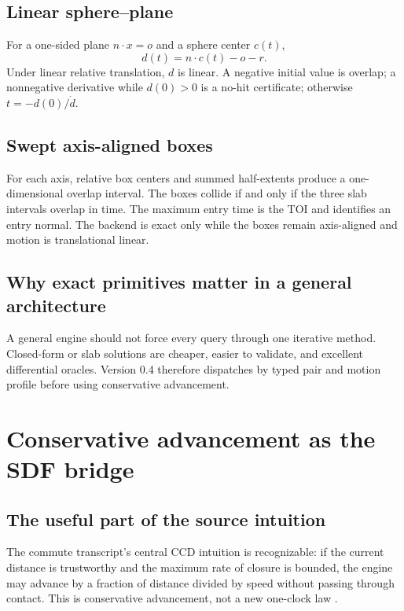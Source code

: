 \documentclass[11pt,a4paper,openany]{book}
\begin{document}
\section{Linear sphere--plane}
For a one-sided plane $n\cdot x=o$ and a sphere center $c(t)$,
\begin{equation}
  d(t)=n\cdot c(t)-o-r.
\end{equation}
Under linear relative translation, $d$ is linear. A negative initial value is overlap; a nonnegative derivative while $d(0)>0$ is a no-hit certificate; otherwise $t=-d(0)/\dot d$.

\section{Swept axis-aligned boxes}
For each axis, relative box centers and summed half-extents produce a one-dimensional overlap interval. The boxes collide if and only if the three slab intervals overlap in time. The maximum entry time is the TOI and identifies an entry normal. The backend is exact only while the boxes remain axis-aligned and motion is translational linear.

\section{Why exact primitives matter in a general architecture}
A general engine should not force every query through one iterative method. Closed-form or slab solutions are cheaper, easier to validate, and excellent differential oracles. Version 0.4 therefore dispatches by typed pair and motion profile before using conservative advancement.

\chapter{Conservative advancement as the SDF bridge}
\section{The useful part of the source intuition}
The commute transcript's central CCD intuition is recognizable: if the current distance is trustworthy and the maximum rate of closure is bounded, the engine may advance by a fraction of distance divided by speed without passing through contact. This is conservative advancement, not a new one-clock law \citep{mirtich1996,zhang2006}.
\end{document}
